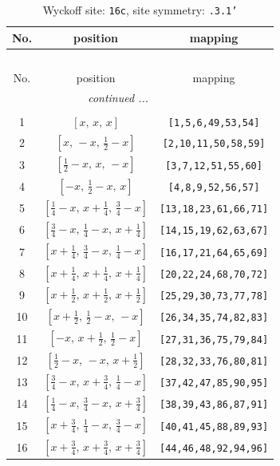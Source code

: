 \documentclass[fleqn,8pt]{jsarticle}
\begin{document}
\renewcommand{\arraystretch}{1.2}
\begin{longtable}{ccc}
\caption{Wyckoff site: {\tt 16c}, site symmetry: {\tt .3.1'}}
 \\
 \hline \hline
No. & position & mapping \\ \hline \endfirsthead

\multicolumn{2}{l}{\tablename\ \thetable{}} \\
 \hline \hline
No. & position & mapping \\ \hline \endhead

 \hline \hline
\multicolumn{2}{r}{\footnotesize\it continued ...} \\ \endfoot

 \hline \hline
\multicolumn{2}{r}{} \\ \endlastfoot

1 & $\left[ x,\, x,\, x \right]$ & {\tt [1,5,6,49,53,54]} \\ \hline
2 & $\left[ x,\, - x,\, \frac{1}{2} - x \right]$ & {\tt [2,10,11,50,58,59]} \\ \hline
3 & $\left[ \frac{1}{2} - x,\, x,\, - x \right]$ & {\tt [3,7,12,51,55,60]} \\ \hline
4 & $\left[ - x,\, \frac{1}{2} - x,\, x \right]$ & {\tt [4,8,9,52,56,57]} \\ \hline
5 & $\left[ \frac{1}{4} - x,\, x + \frac{1}{4},\, \frac{3}{4} - x \right]$ & {\tt [13,18,23,61,66,71]} \\ \hline
6 & $\left[ \frac{3}{4} - x,\, \frac{1}{4} - x,\, x + \frac{1}{4} \right]$ & {\tt [14,15,19,62,63,67]} \\ \hline
7 & $\left[ x + \frac{1}{4},\, \frac{3}{4} - x,\, \frac{1}{4} - x \right]$ & {\tt [16,17,21,64,65,69]} \\ \hline
8 & $\left[ x + \frac{1}{4},\, x + \frac{1}{4},\, x + \frac{1}{4} \right]$ & {\tt [20,22,24,68,70,72]} \\ \hline
9 & $\left[ x + \frac{1}{2},\, x + \frac{1}{2},\, x + \frac{1}{2} \right]$ & {\tt [25,29,30,73,77,78]} \\ \hline
10 & $\left[ x + \frac{1}{2},\, \frac{1}{2} - x,\, - x \right]$ & {\tt [26,34,35,74,82,83]} \\ \hline
11 & $\left[ - x,\, x + \frac{1}{2},\, \frac{1}{2} - x \right]$ & {\tt [27,31,36,75,79,84]} \\ \hline
12 & $\left[ \frac{1}{2} - x,\, - x,\, x + \frac{1}{2} \right]$ & {\tt [28,32,33,76,80,81]} \\ \hline
13 & $\left[ \frac{3}{4} - x,\, x + \frac{3}{4},\, \frac{1}{4} - x \right]$ & {\tt [37,42,47,85,90,95]} \\ \hline
14 & $\left[ \frac{1}{4} - x,\, \frac{3}{4} - x,\, x + \frac{3}{4} \right]$ & {\tt [38,39,43,86,87,91]} \\ \hline
15 & $\left[ x + \frac{3}{4},\, \frac{1}{4} - x,\, \frac{3}{4} - x \right]$ & {\tt [40,41,45,88,89,93]} \\ \hline
16 & $\left[ x + \frac{3}{4},\, x + \frac{3}{4},\, x + \frac{3}{4} \right]$ & {\tt [44,46,48,92,94,96]} \\
\end{longtable}
\end{document}
